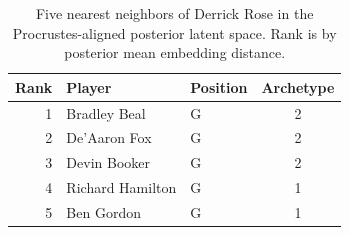 \begin{table}[htbp]
  \centering\small
  \begin{tabular}{rllc}
    \toprule
    Rank & Player & Position & Archetype \\
    \midrule
    1 & Bradley Beal & G & 2 \\
    2 & De'Aaron Fox & G & 2 \\
    3 & Devin Booker & G & 2 \\
    4 & Richard Hamilton & G & 1 \\
    5 & Ben Gordon & G & 1 \\
    \bottomrule
  \end{tabular}
  \caption{Five nearest neighbors of Derrick Rose in the Procrustes-aligned posterior latent space. Rank is by posterior mean embedding distance.}
  \label{tab:Derrick_Rose_neighbors}
\end{table}

